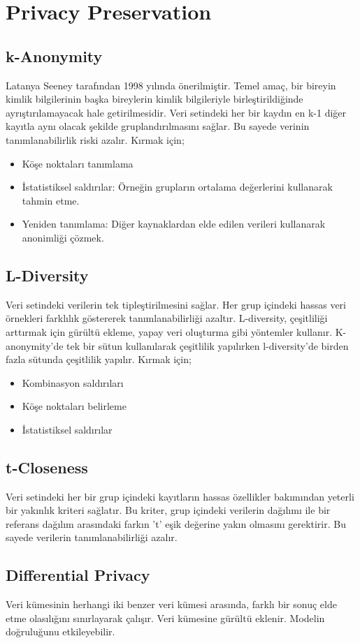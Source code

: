 \section{Privacy Preservation}
\subsection{k-Anonymity}
Latanya Seeney tarafından 1998 yılında önerilmiştir. Temel amaç, bir bireyin kimlik bilgilerinin başka bireylerin kimlik bilgileriyle birleştirildiğinde ayrıştırılamayacak hale getirilmesidir. Veri setindeki her bir kaydın en k-1 diğer kayıtla aynı olacak şekilde gruplandırılmasını sağlar. Bu sayede verinin tanımlanabilirlik riski azalır. Kırmak için;

\begin{itemize}
    \item Köşe noktaları tanımlama
    \item İstatistiksel saldırılar: Örneğin grupların ortalama değerlerini kullanarak tahmin etme.
    \item Yeniden tanımlama: Diğer kaynaklardan elde edilen verileri kullanarak anonimliği çözmek.
\end{itemize}

\subsection{L-Diversity}
Veri setindeki verilerin tek tipleştirilmesini sağlar. Her grup içindeki hassas veri örnekleri farklılık göstererek tanımlanabilirliği azaltır. L-diversity, çeşitliliği arttırmak için gürültü ekleme, yapay veri oluşturma gibi yöntemler kullanır. K-anonymity'de tek bir sütun kullanılarak çeşitlilik yapılırken l-diversity'de birden fazla sütunda çeşitlilik yapılır. Kırmak için;

\begin{itemize}
    \item Kombinasyon saldırıları
    \item Köşe noktaları belirleme
    \item İstatistiksel saldırılar
\end{itemize}

\subsection{t-Closeness}
Veri setindeki her bir grup içindeki kayıtların hassas özellikler bakımından yeterli bir yakınlık kriteri sağlatır. Bu kriter, grup içindeki verilerin dağılımı ile bir referans dağılım arasındaki farkın 't' eşik değerine yakın olmasını gerektirir. Bu sayede verilerin tanımlanabilirliği azalır.

\subsection{Differential Privacy}
Veri kümesinin herhangi iki benzer veri kümesi arasında, farklı bir sonuç elde etme olasılığını sınırlayarak çalışır. Veri kümesine gürültü eklenir. Modelin doğruluğunu etkileyebilir.

\newpage